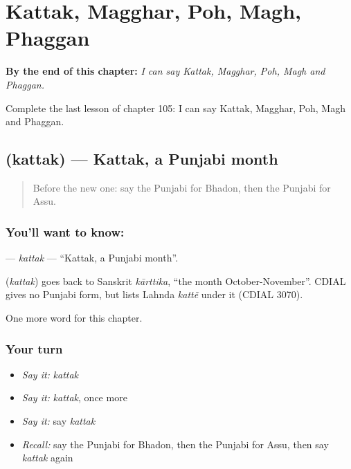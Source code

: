 
\chapter{Kattak, Magghar, Poh, Magh, Phaggan}
\label{ch:pa-kattak-magghar-poh-magh-phaggan}

\begin{chapteropening}
\textbf{By the end of this chapter:} \emph{I can say Kattak, Magghar, Poh, Magh and Phaggan.}

Complete the last lesson of chapter 105: I can say Kattak, Magghar, Poh, Magh and Phaggan.
\end{chapteropening}

\section[\texorpdfstring{\pa{ਕੱਤਕ} (kattak)}{ਕੱਤਕ (kattak)}]{ (kattak) — Kattak, a Punjabi month}

\label{lesson:PA-C105-kattak}



\begin{quote}
Before the new one: say the Punjabi for Bhadon, then the Punjabi for Assu.
\end{quote}

\subsection*{You'll want to know: }
\textbf{} — \emph{kattak} — \textquotedblleft{}Kattak, a Punjabi month\textquotedblright{}.

\begin{cousinweb}
\textbf{} (\emph{kattak}) goes back to Sanskrit \emph{kārttika}, \textquotedblleft{}the month October-November\textquotedblright{}. CDIAL gives no Punjabi form, but lists Lahnda \emph{kattẽ} under it (CDIAL 3070).
\end{cousinweb}

\begin{grammarlens}[title={What you've built}]
One more word for this chapter.
\end{grammarlens}

\subsection*{Your turn}
\begin{itemize}
\raggedright
  \item \emph{Say it:} \emph{kattak}
  \item \emph{Say it:} \emph{kattak}, once more
  \item \emph{Say it:} say \emph{kattak}
  \item \emph{Recall:} say the Punjabi for Bhadon, then the Punjabi for Assu, then say \emph{kattak} again
\end{itemize}

